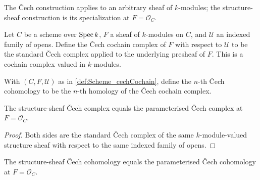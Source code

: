 The \v{C}ech construction applies to an arbitrary sheaf of \(k\)-modules; the structure-sheaf construction is its specialization at \(F=\mathcal O_C\).

\begin{definition}\leanok
  \label{def:Scheme_cechCochain}
  
  Let \(C\) be a scheme over \(\operatorname{Spec} k\), \(F\) a sheaf of \(k\)-modules on \(C\), and \(\mathcal U\) an indexed family of opens. Define the \v{C}ech cochain complex of \(F\) with respect to \(\mathcal U\) to be the standard \v{C}ech complex applied to the underlying presheaf of \(F\). This is a cochain complex valued in \(k\)-modules.
\end{definition}

\begin{definition}\leanok
  \label{def:Scheme_cechCohomology}
  With \((C, F, \mathcal U)\) as in \cref{def:Scheme_cechCochain}, define the \(n\)-th \v{C}ech cohomology to be the \(n\)-th homology of the \v{C}ech cochain complex.
\end{definition}

\begin{theorem}\leanok
  \label{thm:Scheme_cechCochain_OC_eq}
  The structure-sheaf \v{C}ech complex equals the parameterised \v{C}ech complex at \(F = \mathcal O_C\).
\end{theorem}

\begin{proof}
  \leanok
  Both sides are the standard \v{C}ech complex of the same \(k\)-module-valued structure sheaf with respect to the same indexed family of opens.
\end{proof}

\begin{theorem}\leanok
  \label{thm:Scheme_cechCohomology_OC_eq}
  The structure-sheaf \v{C}ech cohomology equals the parameterised \v{C}ech cohomology at \(F = \mathcal O_C\).
\end{theorem}

